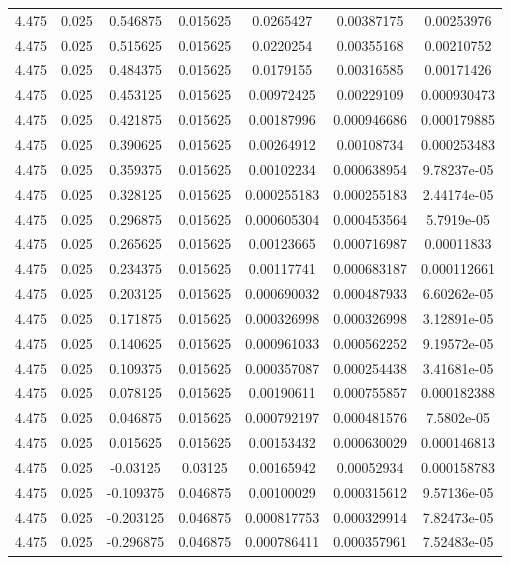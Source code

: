 \begin{flushleft}
\begin{longtable}{ccccccc}
4.475 & 0.025 & 0.546875 & 0.015625 & 0.0265427 & 0.00387175 & 0.00253976  \\ 
4.475 & 0.025 & 0.515625 & 0.015625 & 0.0220254 & 0.00355168 & 0.00210752  \\ 
4.475 & 0.025 & 0.484375 & 0.015625 & 0.0179155 & 0.00316585 & 0.00171426  \\ 
4.475 & 0.025 & 0.453125 & 0.015625 & 0.00972425 & 0.00229109 & 0.000930473  \\ 
4.475 & 0.025 & 0.421875 & 0.015625 & 0.00187996 & 0.000946686 & 0.000179885  \\ 
4.475 & 0.025 & 0.390625 & 0.015625 & 0.00264912 & 0.00108734 & 0.000253483  \\ 
4.475 & 0.025 & 0.359375 & 0.015625 & 0.00102234 & 0.000638954 & 9.78237e-05  \\ 
4.475 & 0.025 & 0.328125 & 0.015625 & 0.000255183 & 0.000255183 & 2.44174e-05  \\ 
4.475 & 0.025 & 0.296875 & 0.015625 & 0.000605304 & 0.000453564 & 5.7919e-05  \\ 
4.475 & 0.025 & 0.265625 & 0.015625 & 0.00123665 & 0.000716987 & 0.00011833  \\ 
4.475 & 0.025 & 0.234375 & 0.015625 & 0.00117741 & 0.000683187 & 0.000112661  \\ 
4.475 & 0.025 & 0.203125 & 0.015625 & 0.000690032 & 0.000487933 & 6.60262e-05  \\ 
4.475 & 0.025 & 0.171875 & 0.015625 & 0.000326998 & 0.000326998 & 3.12891e-05  \\ 
4.475 & 0.025 & 0.140625 & 0.015625 & 0.000961033 & 0.000562252 & 9.19572e-05  \\ 
4.475 & 0.025 & 0.109375 & 0.015625 & 0.000357087 & 0.000254438 & 3.41681e-05  \\ 
4.475 & 0.025 & 0.078125 & 0.015625 & 0.00190611 & 0.000755857 & 0.000182388  \\ 
4.475 & 0.025 & 0.046875 & 0.015625 & 0.000792197 & 0.000481576 & 7.5802e-05  \\ 
4.475 & 0.025 & 0.015625 & 0.015625 & 0.00153432 & 0.000630029 & 0.000146813  \\ 
4.475 & 0.025 & -0.03125 & 0.03125 & 0.00165942 & 0.00052934 & 0.000158783  \\ 
4.475 & 0.025 & -0.109375 & 0.046875 & 0.00100029 & 0.000315612 & 9.57136e-05  \\ 
4.475 & 0.025 & -0.203125 & 0.046875 & 0.000817753 & 0.000329914 & 7.82473e-05  \\ 
4.475 & 0.025 & -0.296875 & 0.046875 & 0.000786411 & 0.000357961 & 7.52483e-05  \\ 

\end{longtable}
\end{flushleft}
